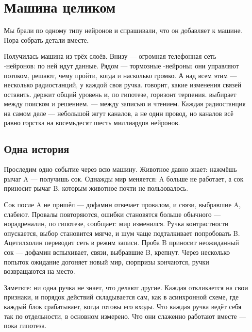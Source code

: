 \chapter{Машина целиком}


Мы брали по одному типу нейронов и спрашивали, что он добавляет к машине. Пора собрать детали вместе.

Получилась машина из трёх слоёв. Внизу --- огромная телефонная сеть -нейронов: по ней идут данные. Рядом --- тормозные -нейроны: они управляют потоком, решают, чему пройти, когда и насколько громко. А над всем этим --- несколько радиостанций, у каждой своя ручка.  говорит, какие изменения связей оставить.  держит общий уровень и, по гипотезе, горизонт терпения.  выбирает между поиском и решением.  --- между записью и чтением. Каждая радиостанция на самом деле --- небольшой жгут каналов, а не один провод, но каналов всё равно горстка на восемьдесят шесть миллиардов нейронов.

\section*{Одна история}

Проследим одно событие через всю машину. Животное давно знает: нажмёшь рычаг A --- получишь сок. Однажды мир меняется: A больше не работает, а сок приносит рычаг B, которым животное почти не пользовалось.

Сок после A не пришёл --- дофамин отвечает провалом, и связи, выбравшие A, слабеют. Провалы повторяются, ошибки становятся больше обычного --- норадреналин, по гипотезе, сообщает: мир изменился. Ручка контрастности опускается, выбор становится мягче, и шум чаще подталкивает попробовать B. Ацетилхолин переводит сеть в режим записи. Проба B приносит неожиданный сок --- дофамин вспыхивает, связи, выбравшие B, крепнут. Через несколько попыток ожидание догоняет новый мир, сюрпризы кончаются, ручки возвращаются на место.

Заметьте: ни одна ручка не знает, что делают другие. Каждая откликается на свои признаки, и порядок действий складывается сам, как в асинхронной схеме, где каждый блок срабатывает, когда готовы его входы. Что каждая ручка ведёт себя так по отдельности, в основном измерено. Что они слаженно работают вместе --- пока гипотеза.

